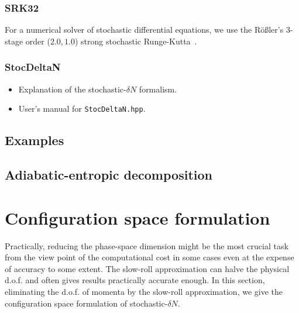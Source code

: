\documentclass[aps, prd
, preprint
, nofootinbib 
, longbibliography
]{revtex4-1}
\begin{document}
\subsubsection{SRK32}

For a numerical solver of stochastic differential equations, we use the R\"o\ss ler's 3-stage order ($2.0,1.0$) strong stochastic Runge-Kutta~\cite{rossler2010runge}.





\subsubsection{StocDeltaN}

\begin{itemize}
\item Explanation of the stochastic-$\delta N$ formalism.
\item User's manual for \texttt{StocDeltaN.hpp}.
\end{itemize}



\subsection{Examples}


\subsection{Adiabatic-entropic decomposition}\label{sec: Adiabatic-entropic decomposition}



\section{Configuration space formulation}

Practically, reducing the phase-space dimension might be the most crucial task from the view point of the computational cost in some cases 
even at the expense of accuracy to some extent. The slow-roll approximation can halve the physical d.o.f. and often gives results practically accurate enough.
In this section, eliminating the d.o.f. of momenta by the slow-roll approximation, we give the configuration space formulation of stochastic-$\delta N$.
\end{document}
